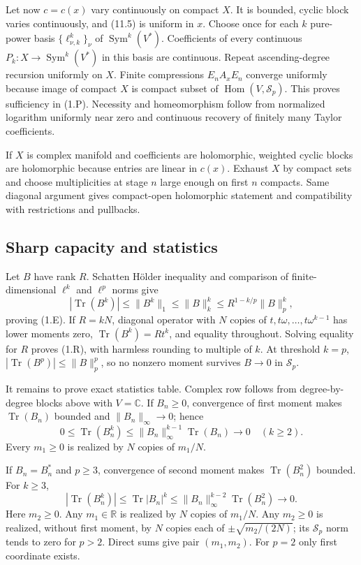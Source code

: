 \documentclass[11pt]{article}
\theoremstyle{definition}
\theoremstyle{remark}
\newcommand{\R}{\mathbb R}
\newcommand{\C}{\mathbb C}
\newcommand{\Tr}{\operatorname{Tr}}
\newcommand{\norm}[1]{\lVert #1\rVert}
\begin{document}
Let now $c=c(x)$ vary continuously on compact $X$.  It is bounded, cyclic block varies
continuously, and (11.5) is uniform in $x$.  Choose once for each $k$ pure-power basis
$\{\ell_{\nu,k}^k\}_\nu$ of $\operatorname{Sym}^k(V^*)$.  Coefficients of every continuous
$P_k:X\to\operatorname{Sym}^k(V^*)$ in this basis are continuous.  Repeat ascending-degree
recursion uniformly on $X$.  Finite compressions $E_nA_xE_n$ converge uniformly because image
of compact $X$ is compact subset of $\operatorname{Hom}(V,\mathcal S_p)$.  This proves
sufficiency in (1.P).  Necessity and homeomorphism follow from normalized logarithm uniformly
near zero and continuous recovery of finitely many Taylor coefficients.

If $X$ is complex manifold and coefficients are holomorphic, weighted cyclic blocks are
holomorphic because entries are linear in $c(x)$.  Exhaust $X$ by compact sets and choose
multiplicities at stage $n$ large enough on first $n$ compacts.  Same diagonal argument gives
compact-open holomorphic statement and compatibility with restrictions and pullbacks.

\subsection*{Sharp capacity and statistics}

Let $B$ have rank $R$.  Schatten H\"older inequality and comparison of finite-dimensional
$\ell^k$ and $\ell^p$ norms give
\[
 |\Tr(B^k)|\leq\norm{B^k}_1
 \leq\norm{B}_k^k
 \leq R^{1-k/p}\norm{B}_p^k,
\]
proving (1.E).  If $R=kN$, diagonal operator with $N$ copies of
$t,t\omega,\ldots,t\omega^{k-1}$ has lower moments zero,
$\Tr(B^k)=Rt^k$, and equality throughout.  Solving equality for $R$ proves (1.R), with harmless
rounding to multiple of $k$.  At threshold $k=p$,
$|\Tr(B^p)|\leq\norm{B}_p^p$, so no nonzero moment survives $B\to0$ in $\mathcal S_p$.

It remains to prove exact statistics table.  Complex row follows from degree-by-degree blocks
above with $V=\C$.  If $B_n\geq0$, convergence of first moment makes $\Tr(B_n)$ bounded and
$\norm{B_n}_\infty\to0$; hence
\[
 0\leq\Tr(B_n^k)\leq\norm{B_n}_\infty^{k-1}\Tr(B_n)\longrightarrow0
 \quad(k\geq2).
\]
Every $m_1\geq0$ is realized by $N$ copies of $m_1/N$.

If $B_n=B_n^*$ and $p\geq3$, convergence of second moment makes $\Tr(B_n^2)$ bounded.  For
$k\geq3$,
\[
 |\Tr(B_n^k)|\leq\Tr|B_n|^k
 \leq\norm{B_n}_\infty^{k-2}\Tr(B_n^2)\longrightarrow0.
\]
Here $m_2\geq0$.  Any $m_1\in\R$ is realized by $N$ copies of $m_1/N$.  Any $m_2\geq0$ is
realized, without first moment, by $N$ copies each of
$\pm\sqrt{m_2/(2N)}$; its $\mathcal S_p$ norm tends to zero for $p>2$.  Direct sums give pair
$(m_1,m_2)$.  For $p=2$ only first coordinate exists.
\end{document}
